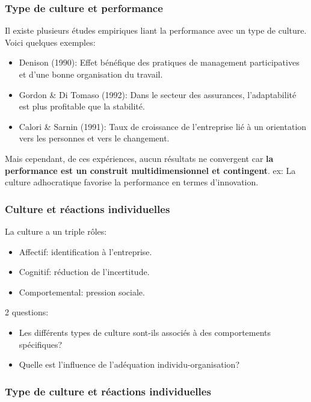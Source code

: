 \documentclass[12pt]{article}
\begin{document}
		\subsubsection{Type de culture et performance}
		
		Il existe plusieurs études empiriques liant la performance avec un type de culture. Voici quelques exemples:
		\begin{itemize}
		\item Denison (1990): Effet bénéfique des pratiques de management participatives et d'une bonne organisation du travail.
		\item Gordon \& Di Tomaso (1992): Dans le secteur des assurances, l'adaptabilité est plus profitable que la stabilité.
		\item Calori \& Sarnin (1991): Taux de croissance de l'entreprise lié à un orientation vers les personnes et vers le changement. \newline
		\end{itemize}
		Mais cependant, de ces expériences, aucun résultats ne convergent car \textbf{la performance est un construit multidimensionnel et contingent}. \newline
		ex: La culture adhocratique favorise la performance en termes d'innovation.
		
		\subsubsection{Culture et réactions individuelles}
		
		La culture a un triple rôles: 
		\begin{itemize}
		\item Affectif: identification à l'entreprise.
		\item Cognitif: réduction de l'incertitude.
		\item Comportemental: pression sociale. \newline
		\end{itemize}
	
		2 questions:
		\begin{itemize}
		\item Les différents types de culture sont-ils associés à des comportements spécifiques?
		\item Quelle est l'influence de l'adéquation individu-organisation?
		\end{itemize}

		\subsubsection*{Type de culture et réactions individuelles}
\end{document}
